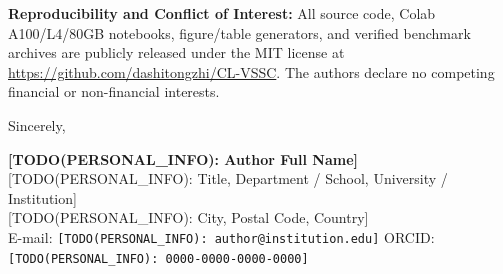 \documentclass[11pt,letterpaper]{article}
\begin{document}
\textbf{Reproducibility and Conflict of Interest:}
All source code, Colab A100/L4/80GB notebooks, figure/table generators, and verified benchmark archives are publicly released under the MIT license at \url{https://github.com/dashitongzhi/CL-VSSC}. The authors declare no competing financial or non-financial interests.

\vspace{6pt}
Sincerely,

\textbf{[TODO(PERSONAL\_INFO): Author Full Name]}\\
{[TODO(PERSONAL\_INFO): Title, Department / School, University / Institution]}\\
{[TODO(PERSONAL\_INFO): City, Postal Code, Country]}\\
E-mail: \texttt{[TODO(PERSONAL\_INFO): author@institution.edu]} \quad ORCID: \texttt{[TODO(PERSONAL\_INFO): 0000-0000-0000-0000]}
\end{document}
